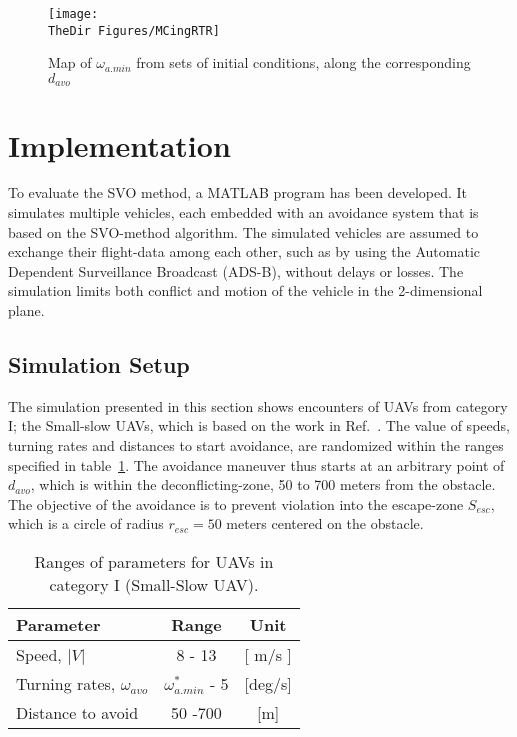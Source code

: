\begin{figure}
 \texttt{[image: \\TheDir Figures/MCingRTR]}
 \centering
 \caption{Map of $\omega_{a.min}$ from sets of initial conditions, along the corresponding $d_{avo}$}
 \label{f:ReqTurnRate}
\end{figure}


\section{Implementation}
To evaluate the SVO method, a MATLAB program has been developed. It simulates multiple vehicles, each embedded with an avoidance system that is based on the SVO-method algorithm. The simulated vehicles are assumed to exchange their flight-data among each other, such as by using the Automatic Dependent Surveillance Broadcast (ADS-B), without delays or losses. The simulation limits both conflict and motion of the vehicle in the 2-dimensional plane.

\subsection{Simulation Setup}
The simulation presented in this section shows encounters of UAVs from category I; the Small-slow UAVs, which is based on the work in Ref.~\cite{Jenie:13a}. The value of speeds, turning rates and distances to start avoidance, are randomized within the ranges specified in table~\ref{t:RangeSSUAV}. The avoidance maneuver thus starts at an arbitrary point of $d_{avo}$, which is within the deconflicting-zone, 50 to 700 meters from the obstacle. The objective of the avoidance is to prevent violation into the escape-zone $S_{esc}$, which is a circle of radius $r_{esc} = 50$ meters centered on the obstacle.

\begin{table}
 \begin{center}
   \caption{Ranges of parameters for UAVs in category I (Small-Slow UAV)\cite{Jenie:13a}.}
   \label{t:RangeSSUAV}
   \begin{tabular}{lcc}
   \hline \hline
    Parameter & Range & Unit \\
    \hline
    Speed, $|V|$ & 8 - 13 & [ m/s ] \\
    Turning rates, $\omega_{avo}$ &  $\omega_{a.min}^*$ - 5   & [deg/s]\\
    Distance to avoid & 50 -700 & [m] \\
     \hline \hline
   \end{tabular}
 \end{center}
\end{table}

